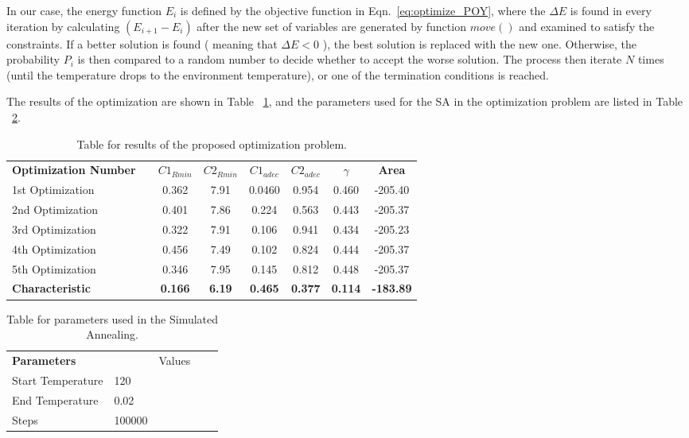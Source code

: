 In our case, the energy function $E_i$ is defined by the objective function in Eqn.~\ref{eq:optimize_POY}, where the $\Delta E$ is found in every iteration by calculating $(E_{i+1} - E_i)$ after the new set of variables are generated by function $move()$ and examined to satisfy the constraints. If a better solution is found ( meaning that $\Delta E < 0$ ), the best solution is replaced with the new one. Otherwise, the probability $P_i$ is then compared to a random number to decide whether to accept the worse solution. The process then iterate $N$ times (until the temperature drops to the environment temperature), or one of the termination conditions is reached. 

The results of the optimization are shown in Table ~\ref{table:SAresults}, and the parameters used for the \ac{SA} in the optimization problem are listed in Table ~\ref{table:SAparams}.


\begin{table}[htbp]
\caption{Table for results of the proposed optimization problem.}
\begin{center}
\label{table:SAresults}
\begin{tabular}{l l c c c c c c}
& & \\ %
\hline
\textbf{Optimization Number} &  &\textbf{${C1}_{Rmin}$} &\textbf{${C2}_{Rmin}$} &\textbf{${C1}_{adec}$} &\textbf{${C2}_{adec}$} & \textbf{$\gamma$} & \textbf{Area}\\
\hline
1st Optimization  &  & 0.362 & 7.91 & 0.0460 & 0.954 & 0.460 & -205.40 \\
2nd Optimization  &  & 0.401 & 7.86 & 0.224 & 0.563 & 0.443 & -205.37 \\
3rd Optimization  &  & 0.322 & 7.91 & 0.106 & 0.941 & 0.434 & -205.23 \\
4th Optimization  &  & 0.456 & 7.49 & 0.102 & 0.824 & 0.444 & -205.37 \\
5th Optimization  &  & 0.346 & 7.95 & 0.145 & 0.812 & 0.448 & -205.37 \\
\textbf{Characteristic}  &  & \textbf{0.166} & \textbf{6.19} & \textbf{0.465} & \textbf{0.377} & \textbf{0.114} & \textbf{-183.89} \\
\hline
\end{tabular}
\end{center}
\end{table}

\begin{table}[htbp]
\caption{Table for parameters used in the Simulated Annealing.}
\begin{center}
\label{table:SAparams}
\begin{tabular}{l l c c c}
& & \\ %
\hline
\textbf{Parameters} &   & Values \\
\hline
Start Temperature    &  120  \\
End Temperature      &  0.02 \\
Steps                & 100000 \\

\hline
\end{tabular}
\end{center}
\end{table}


